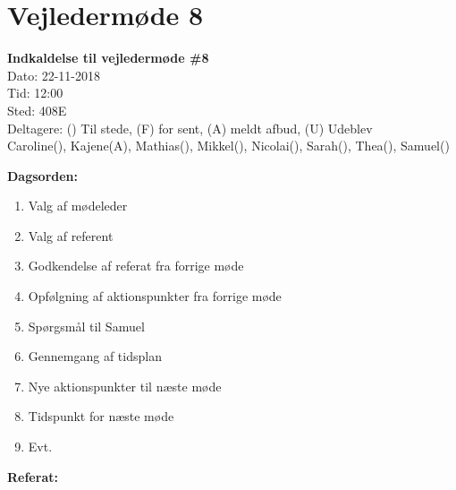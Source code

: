 \section{Vejledermøde 8}

\vspace{0.5 cm}
\textbf{Indkaldelse til vejledermøde \#8} \\

Dato: 22-11-2018 \\
Tid: 12:00 \\
Sted: 408E \\
Deltagere: () Til stede, (F) for sent, (A) meldt afbud, (U) Udeblev \\
Caroline(), Kajene(A), Mathias(), Mikkel(), Nicolai(), Sarah(), Thea(), Samuel() 

\vspace{0.1 cm}
\textbf{Dagsorden:}

\begin{enumerate}
	\item Valg af mødeleder
	\item Valg af referent
	\item Godkendelse af referat fra forrige møde
	\item Opfølgning af aktionspunkter fra forrige møde
	\item Spørgsmål til Samuel
	\item Gennemgang af tidsplan
	\item Nye aktionspunkter til næste møde
	\item Tidspunkt for næste møde
	\item Evt.
\end{enumerate}

\textbf{Referat:}

